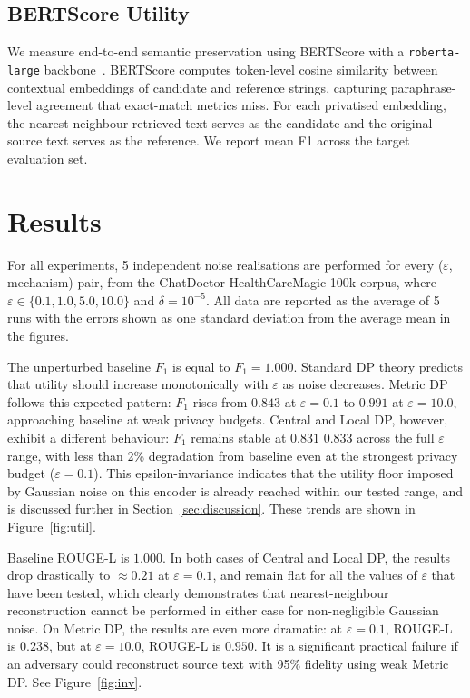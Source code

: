 \documentclass[11pt, a4paper]{article}
\begin{document}
\subsection{BERTScore Utility}
We measure end-to-end semantic preservation using BERTScore with a \texttt{roberta-large} backbone~\cite{zhang2020bertscore}. BERTScore computes token-level cosine similarity between contextual embeddings of candidate and reference strings, capturing paraphrase-level agreement that exact-match metrics miss. For each privatised embedding, the nearest-neighbour retrieved text serves as the candidate and the original source text serves as the reference. We report mean F1 across the target evaluation set.

\section{Results}

For all experiments, 5 independent noise realisations are performed for every ($\varepsilon$, mechanism) pair, from the ChatDoctor-HealthCareMagic-100k corpus, where $\varepsilon \in \{0.1, 1.0, 5.0, 10.0\}$ and $\delta = 10^{-5}$. All data are reported as the average of 5 runs with the errors shown as one standard deviation from the average mean in the figures.

The unperturbed baseline $F_1$ is equal to $F_1 = 1.000$. Standard DP theory predicts that utility should increase monotonically with $\varepsilon$ as noise decreases. Metric DP follows this expected pattern: $F_1$ rises from $0.843$ at $\varepsilon=0.1$ to $0.991$ at $\varepsilon=10.0$, approaching baseline at weak privacy budgets. Central and Local DP, however, exhibit a different behaviour: $F_1$ remains stable at $0.831$ $0.833$ across the full $\varepsilon$ range, with less than 2\% degradation from baseline even at the strongest privacy budget ($\varepsilon = 0.1$). This epsilon-invariance indicates that the utility floor imposed by Gaussian noise on this encoder is already reached within our tested range, and is discussed further in Section~\ref{sec:discussion}. These trends are shown in Figure~\ref{fig:util}.

Baseline ROUGE-L is $1.000$. In both cases of Central and Local DP, the results drop drastically to $\approx 0.21$ at $\varepsilon=0.1$, and remain flat for all the values of $\varepsilon$ that have been tested, which clearly demonstrates that nearest-neighbour reconstruction cannot be performed in either case for non-negligible Gaussian noise. On Metric DP, the results are even more dramatic: at $\varepsilon=0.1$, ROUGE-L is $0.238$, but at $\varepsilon=10.0$, ROUGE-L is $0.950$. It is a significant practical failure if an adversary could reconstruct source text with 95\% fidelity using weak Metric DP. See Figure~\ref{fig:inv}.
\end{document}
